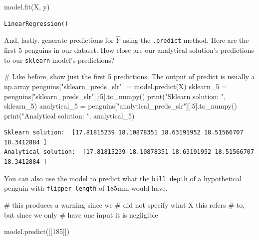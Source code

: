 \documentclass[
  letterpaper,
  DIV=11,
  numbers=noendperiod]{scrreprt}
\newenvironment{Shaded}{\begin{snugshade}}{\end{snugshade}}
\newcommand{\BuiltInTok}[1]{\textcolor[rgb]{0.00,0.23,0.31}{#1}}
\newcommand{\CommentTok}[1]{\textcolor[rgb]{0.37,0.37,0.37}{#1}}
\newcommand{\DecValTok}[1]{\textcolor[rgb]{0.68,0.00,0.00}{#1}}
\newcommand{\NormalTok}[1]{\textcolor[rgb]{0.00,0.23,0.31}{#1}}
\newcommand{\OperatorTok}[1]{\textcolor[rgb]{0.37,0.37,0.37}{#1}}
\newcommand{\StringTok}[1]{\textcolor[rgb]{0.13,0.47,0.30}{#1}}
\begin{document}
\begin{Shaded}
\begin{Highlighting}[]
\NormalTok{model.fit(X, y)}
\end{Highlighting}
\end{Shaded}

\begin{verbatim}
LinearRegression()
\end{verbatim}

And, lastly, generate predictions for \(\hat{Y}\) using the
\texttt{.predict} method. Here are the first 5 penguins in our dataset.
How close are our analytical solution's predictions to our
\texttt{sklearn} model's predictions?

\begin{Shaded}
\begin{Highlighting}[]
\CommentTok{\# Like before, show just the first 5 predictions. The output of predict is usually a np.array}
\NormalTok{penguins[}\StringTok{"sklearn\_preds\_slr"}\NormalTok{] }\OperatorTok{=}\NormalTok{ model.predict(X)}
\NormalTok{sklearn\_5 }\OperatorTok{=}\NormalTok{ penguins[}\StringTok{"sklearn\_preds\_slr"}\NormalTok{][:}\DecValTok{5}\NormalTok{].to\_numpy()}
\BuiltInTok{print}\NormalTok{(}\StringTok{"Sklearn solution: "}\NormalTok{, sklearn\_5)}
\NormalTok{analytical\_5 }\OperatorTok{=}\NormalTok{ penguins[}\StringTok{"analytical\_preds\_slr"}\NormalTok{][:}\DecValTok{5}\NormalTok{].to\_numpy()}
\BuiltInTok{print}\NormalTok{(}\StringTok{"Analytical solution: "}\NormalTok{, analytical\_5)}
\end{Highlighting}
\end{Shaded}

\begin{verbatim}
Sklearn solution:  [17.81815239 18.10878351 18.63191952 18.51566707 18.3412884 ]
Analytical solution:  [17.81815239 18.10878351 18.63191952 18.51566707 18.3412884 ]
\end{verbatim}

You can also use the model to predict what the \texttt{bill\ depth} of a
hypothetical penguin with \texttt{flipper\ length} of 185mm would have.

\begin{Shaded}
\begin{Highlighting}[]
\CommentTok{\# this produces a warning since we}
\CommentTok{\# did not specify what X this refers}
\CommentTok{\# to, but since we only }
\CommentTok{\# have one input it is negligible}

\NormalTok{model.predict([[}\DecValTok{185}\NormalTok{]]) }
\end{Highlighting}
\end{Shaded}
\end{document}
